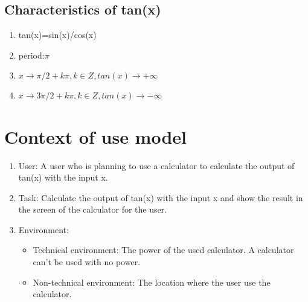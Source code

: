 \documentclass[10pt,a4paper,twoside]{article}
\begin{document}




\subsection{Characteristics of tan(x)}
\begin{enumerate}
\item tan(x)=sin(x)/cos(x)
\item period:$\pi$
\item $x\rightarrow \pi /2+k\pi, k\in Z,tan(x)\rightarrow+\infty$
\item $x\rightarrow3\pi/2+k\pi, k\in Z,tan(x)\rightarrow-\infty$
\end{enumerate}


\section{Context of use model}

\begin{enumerate}
\item 
User: A user who is planning to use a calculator to calculate the output of tan(x) with the input x.
\item
Task: Calculate the output of tan(x) with the input x and show the result in the screen of the calculator for the user.
\item
Environment:
\begin{itemize}
\item Technical environment:
The power of the used calculator. A calculator can't be used with no power.
\item Non-technical environment:
The location where the user use the calculator.
\end{itemize}
\end{enumerate}
\end{document}
